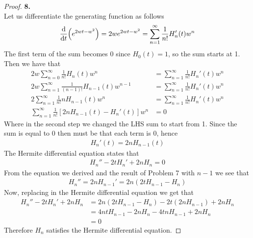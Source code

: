 \documentclass[11pt]{article}
\theoremstyle{definition}
\begin{document}
\cleardoublepage
\begin{proof}{\textbf{8.}}\\
Let us differentiate the generating function as follows
\begin{align*}
    \dv{t}(e^{2wt - w^2}) = 2we^{2wt - w^2}
    = \sum_{n=1}^\infty \frac{1}{n!}H_n'(t) w^n
\end{align*}
The first term of the sum becomes 0 since $H_0(t) = 1$, so the sum starts at 1.
Then we have that
\begin{align*}
    2w\sum_{n=0}^\infty \frac{1}{n!}H_n(t) w^n
    &= \sum_{n=1}^\infty \frac{1}{n!}H_n'(t) w^n\\
    2w\sum_{n=1}^\infty \frac{1}{(n-1)!}H_{n-1}(t) w^{n-1}
    &= \sum_{n=1}^\infty \frac{1}{n!}H_n'(t) w^n\\
    2\sum_{n=1}^\infty \frac{1}{n!} n H_{n-1}(t) w^{n}
    &= \sum_{n=1}^\infty \frac{1}{n!}H_n'(t) w^n\\
    \sum_{n=1}^\infty \frac{1}{n!} [2n H_{n-1}(t) - H_n'(t)] w^n &= 0
\end{align*}
Where in the second step we changed the LHS sum to start from 1. Since the sum
is equal to 0 then must be that each term is 0, hence
\begin{align*}
    H_n'(t) = 2n H_{n-1}(t)
\end{align*}
The Hermite differential equation states that
\begin{align*}
    H_n'' - 2tH_n' + 2nH_n = 0
\end{align*}
From the equation we derived and the result of Problem 7 with $n-1$ 
we see that
\begin{align*}
    H_n'' = 2n H_{n-1}' = 2n(2tH_{n-1} - H_{n})
\end{align*}
Now, replacing in the Hermite differential equation we get that
\begin{align*}
    H_n'' - 2tH_n' + 2nH_n
    &= 2n(2tH_{n-1} - H_{n}) - 2t(2n H_{n-1}) + 2nH_n\\
    &= 4ntH_{n-1} - 2nH_{n} - 4tn H_{n-1} + 2nH_n\\
    &= 0
\end{align*}
Therefore $H_n$ satisfies the Hermite differential equation.
\end{proof}
\end{document}
